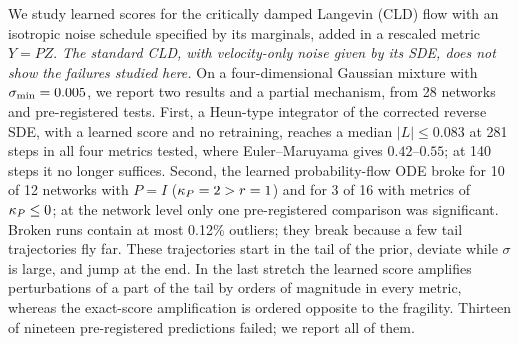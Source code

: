 We study learned scores for the critically damped Langevin (CLD) flow with an isotropic noise schedule specified by its marginals, added in a rescaled metric $Y=PZ$.
\emph{The standard CLD, with velocity-only noise given by its SDE, does not show the failures studied here.}
On a four-dimensional Gaussian mixture with $\sigma_{\min}=0.005$, we report two results and a partial mechanism, from 28 networks and pre-registered tests.
First, a Heun-type integrator of the corrected reverse SDE, with a learned score and no retraining, reaches a median $|L|\leq0.083$ at 281 steps in all four metrics tested, where Euler--Maruyama gives $0.42$--$0.55$; at 140 steps it no longer suffices.
Second, the learned probability-flow ODE broke for 10 of 12 networks with $P=I$ ($\kappa_P=2>r=1$) and for 3 of 16 with metrics of $\kappa_P\leq0$; at the network level only one pre-registered comparison was significant.
Broken runs contain at most 0.12\% outliers; they break because a few tail trajectories fly far.
These trajectories start in the tail of the prior, deviate while $\sigma$ is large, and jump at the end.
In the last stretch the learned score amplifies perturbations of a part of the tail by orders of magnitude in every metric, whereas the exact-score amplification is ordered opposite to the fragility.
Thirteen of nineteen pre-registered predictions failed; we report all of them.
